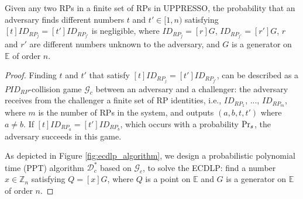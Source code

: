   \begin{lemma}\label{lemma-rp}
    Given any two RPs in a finite set of RPs in UPPRESSO,
    the probability that an adversary finds different numbers $t$ and $t' \in [1,n)$ satisfying $[t]ID_{RP_j} = [t']ID_{RP_{j'}}$ is negligible, where $ID_{RP_j}=[r]G$, $ID_{RP_{j'}}=[r']G$, $r$ and $r'$ are different numbers unknown to the adversary, and $G$ is a generator on $\mathbb{E}$ of order $n$.
  \end{lemma}
  \begin{proof}
    Finding $t$ and $t'$ that satisfy $[t]ID_{RP_j} = [t']ID_{RP_{j'}}$, can be described as a $PID_{RP}$-collision game $\mathcal{G}_c$ between an adversary and a challenger: the adversary receives from the challenger a finite set of RP identities, i.e., $ID_{RP_1}$, ..., $ID_{RP_m}$, where $m$ is the number of RPs in the system, and outputs $(a, b, t, t')$ where $a \neq b$. If $[t]ID_{RP_a}=[t']ID_{RP_b}$, which occurs with a probability ${\rm Pr}_s$, the adversary succeeds in this game.
    
    As depicted in Figure \ref{fig:ecdlp_algorithm}, we design a probabilistic polynomial time (PPT) algorithm $\mathcal{D}^*_c$ based on $\mathcal{G}_c$, to solve the ECDLP: find a number $x \in \mathbb{Z}_n$ satisfying $Q = [x]G$, where $Q$ is a point on $\mathbb{E}$ and $G$ is a generator on $\mathbb{E}$ of order $n$.
  

\end{proof}
